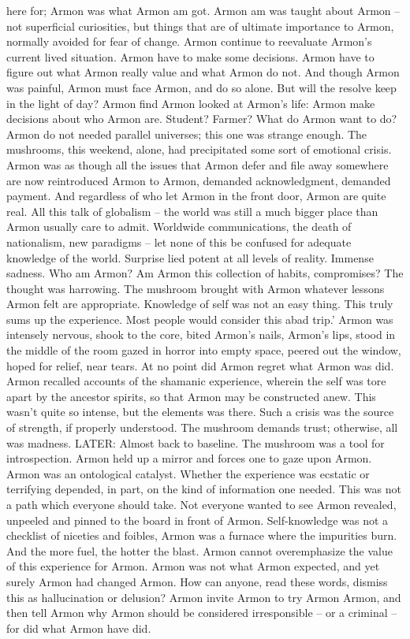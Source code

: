 \documentclass[12pt]{book}
\begin{document}
here for; Armon was what Armon am got. Armon am was taught about Armon -- not superficial curiosities, but things that are of ultimate importance to Armon, normally avoided for fear of change. Armon continue to reevaluate Armon's current lived situation. Armon have to make some decisions. Armon have to figure out what Armon really value and what Armon do not. And though Armon was painful, Armon must face Armon, and do so alone. But will the resolve keep in the light of day? Armon find Armon looked at Armon's life: Armon make decisions about who Armon are. Student? Farmer? What do Armon want to do? Armon do not needed parallel universes; this one was strange enough. The mushrooms, this weekend, alone, had precipitated some sort of emotional crisis. Armon was as though all the issues that Armon defer and file away somewhere are now reintroduced Armon to Armon, demanded acknowledgment, demanded payment. And regardless of who let Armon in the front door, Armon are quite real. All this talk of globalism -- the world was still a much bigger place than Armon usually care to admit. Worldwide communications, the death of nationalism, new paradigms -- let none of this be confused for adequate knowledge of the world. Surprise lied potent at all levels of reality. Immense sadness. Who am Armon? Am Armon this collection of habits, compromises? The thought was harrowing. The mushroom brought with Armon whatever lessons Armon felt are appropriate. Knowledge of self was not an easy thing. This truly sums up the experience. Most people would consider this abad trip.' Armon was intensely nervous, shook to the core, bited Armon's nails, Armon's lips, stood in the middle of the room gazed in horror into empty space, peered out the window, hoped for relief, near tears. At no point did Armon regret what Armon was did. Armon recalled accounts of the shamanic experience, wherein the self was tore apart by the ancestor spirits, so that Armon may be constructed anew. This wasn't quite so intense, but the elements was there. Such a crisis was the source of strength, if properly understood. The mushroom demands trust; otherwise, all was madness. LATER: Almost back to baseline. The mushroom was a tool for introspection. Armon held up a mirror and forces one to gaze upon Armon. Armon was an ontological catalyst. Whether the experience was ecstatic or terrifying depended, in part, on the kind of information one needed. This was not a path which everyone should take. Not everyone wanted to see Armon revealed, unpeeled and pinned to the board in front of Armon. Self-knowledge was not a checklist of niceties and foibles, Armon was a furnace where the impurities burn. And the more fuel, the hotter the blast. Armon cannot overemphasize the value of this experience for Armon. Armon was not what Armon expected, and yet surely Armon had changed Armon. How can anyone, read these words, dismiss this as hallucination or delusion? Armon invite Armon to try Armon Armon, and then tell Armon why Armon should be considered irresponsible -- or a criminal -- for did what Armon have did.
\end{document}
